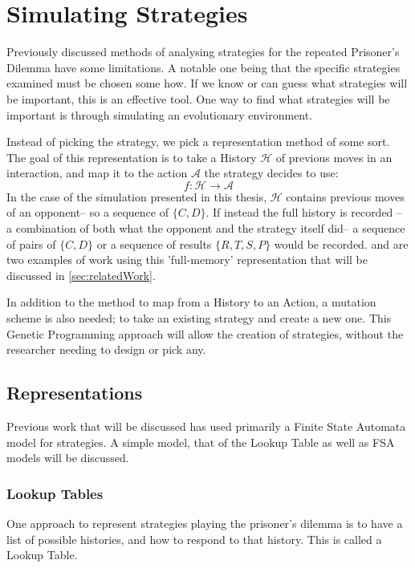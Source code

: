 \documentclass[a4paper,11pt,bcshonoursthesis,singlespace,twoside,thesisdraft,pdflatex]{cssethesis}
\begin{document}
\section{Simulating Strategies}
Previously discussed methods of analysing strategies for the repeated Prisoner's Dilemma have some limitations. 
A notable one being that the specific strategies examined must be chosen some how. 
If we know or can guess what strategies will be important, this is an effective tool. 
One way to find what strategies will be important is through simulating an evolutionary environment. 

Instead of picking the strategy, we pick a representation method of some sort. 
The goal of this representation is to take a History $\mathcal{H}$ of previous moves in an interaction, and map it to the action $\mathcal{A}$ the strategy decides to use:
\begin{equation}
f: \mathcal{H} \rightarrow \mathcal{A}
\end{equation}
In the case of the simulation presented in this thesis, $\mathcal{H}$ contains previous moves of an opponent-- so a sequence of $\{C,D\}$. 
If instead the full history is recorded -- a combination of both what the opponent and the strategy itself did-- a sequence of pairs of $\{C,D\}$ or a sequence of results $\{R,T,S,P\}$ would be recorded. \citet{Axelrod1987} and \citet{fogel1993evolving} are two examples of work using this 'full-memory' representation that will be discussed in \ref{sec:relatedWork}.

In addition to the method to map from a History to an Action, a mutation scheme is also needed; to take an existing strategy and create a new one. 
This Genetic Programming approach will allow the creation of strategies, without the researcher needing to design or pick any. 
\subsection{Representations}
Previous work that will be discussed has used primarily a Finite State Automata model for strategies. 
A simple model, that of the Lookup Table as well as FSA models will be discussed.
\subsubsection{Lookup Tables}
One approach to represent strategies playing the prisoner's dilemma is to have a list of possible histories, and how to respond to that history. This is called a Lookup Table. 
\end{document}
